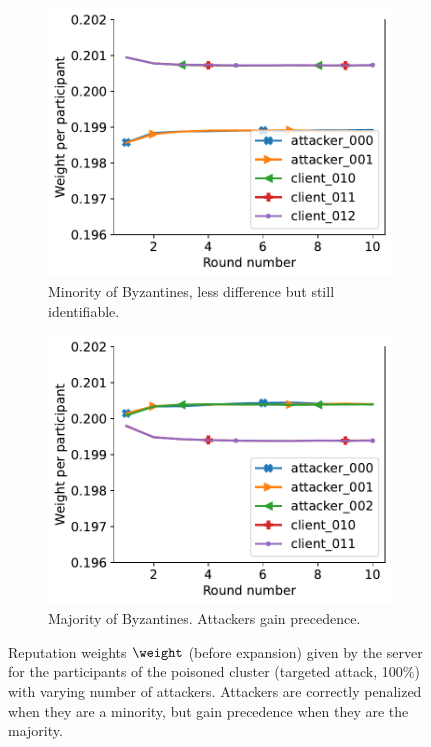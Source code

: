 \begin{figure}[!t]
  \begin{subfigure}[t]{0.40\linewidth}
    \centering
    \includegraphics[trim=0 0 10pt 0,clip,width=\linewidth]{figures/reput/byzantine_minority_loud_non_expanded.pdf}
    \caption{Minority of Byzantines, less difference but still identifiable.}
    \label{fig:byzantine_minority_loud_non_expanded}
  \end{subfigure}
  \quad 
  \begin{subfigure}[t]{0.40\linewidth}
    \centering
    \includegraphics[trim=0 0 10pt 0,clip,width=\linewidth]{figures/reput/byzantine_majority_loud_non_expanded.pdf}
    \caption{Majority of Byzantines. Attackers gain precedence.}
    \label{fig:byzantine_majority_loud_non_expanded}
  \end{subfigure}
  \caption{
    Reputation weights $\weight$ (before expansion) given by the server for the participants of the poisoned cluster (targeted attack, 100\%) with varying number of attackers.  
    Attackers are correctly penalized when they are a minority, but gain precedence when they are the majority.}
  \label{fig:non_expanded_reputation}
\end{figure}
